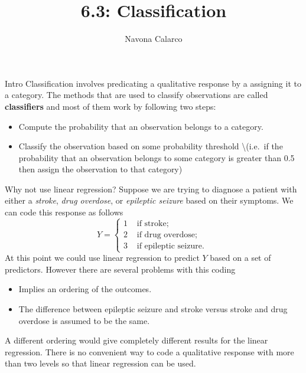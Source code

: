 \documentclass[
  ignorenonframetext,
  aspectratio=169,
]{beamer}
\title{6.3: Classification}
\author{Navona Calarco}
\date{}
\institute{The University of Toronto}
\begin{document}
\frame{\titlepage}
\ifdefined\Shaded\renewenvironment{Shaded}{\begin{tcolorbox}[interior hidden, sharp corners, breakable, borderline west={3pt}{0pt}{shadecolor}, enhanced, boxrule=0pt, frame hidden]}{\end{tcolorbox}}\fi

\begin{frame}{Intro}
\protect\hypertarget{intro}{}
Classification involves predicating a qualitative response by a
assigning it to a category. The methods that are used to classify
observations are called \textbf{classifiers} and most of them work by
following two steps:

\begin{itemize}
\item
  Compute the probability that an observation belongs to a category.
\item
  Classify the observation based on some probability threshold
  \textbackslash(i.e.~if the probability that an observation belongs to
  some category is greater than 0.5 then assign the observation to that
  category)
\end{itemize}
\end{frame}

\begin{frame}{Why not use linear regression?}
\protect\hypertarget{why-not-use-linear-regression}{}
Suppose we are trying to diagnose a patient with either a \emph{stroke},
\emph{drug overdose}, or \emph{epileptic seizure} based on their
symptoms. We can code this response as follows \[
    Y=\left\{\begin{array}{ll}
1 & \text { if stroke; } \\
2 & \text { if drug overdose; } \\
3 & \text { if epileptic seizure. }
\end{array}\right.
\] At this point we could use linear regression to predict \(Y\) based
on a set of predictors. However there are several problems with this
coding

\begin{itemize}
\item
  Implies an ordering of the outcomes.
\item
  The difference between epileptic seizure and stroke versus stroke and
  drug overdose is assumed to be the same.
\end{itemize}

A different ordering would give completely different results for the
linear regression.
\alert{There is no convenient way to code a qualitative response with more than two levels so that linear regression can be used.}
\end{frame}
\end{document}
